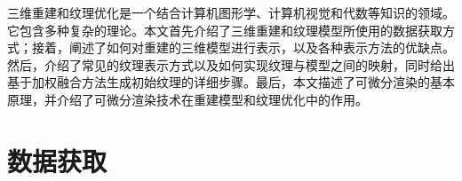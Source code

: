 

三维重建和纹理优化是一个结合计算机图形学、计算机视觉和代数等知识的领域。它包含多种复杂的理论。本文首先介绍了三维重建和纹理模型所使用的数据获取方式；接着，阐述了如何对重建的三维模型进行表示，以及各种表示方法的优缺点。然后，介绍了常见的纹理表示方式以及如何实现纹理与模型之间的映射，同时给出基于加权融合方法生成初始纹理的详细步骤。最后，本文描述了可微分渲染的基本原理，并介绍了可微分渲染技术在重建模型和纹理优化中的作用。
%
%
\section{数据获取}

